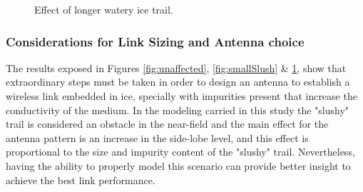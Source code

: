 \begin{figure}[H]
	\centering
	\caption{Effect of longer watery ice trail.}
	\label{fig:bigSlush}
\end{figure}

\subsubsection{Considerations for Link Sizing and Antenna choice}
The results exposed in Figures \ref{fig:unaffected}, \ref{fig:smallSlush} \& \ref{fig:bigSlush}, show that extraordinary steps must be taken in order to design an antenna to establish a wireless link embedded in ice, specially with impurities present that increase the conductivity of the medium. In the modeling carried in this study the "slushy" trail is considered an obstacle in the near-field and the main effect for the antenna pattern is an increase in the side-lobe level, and this effect is proportional to the size and impurity content of the "slushy" trail. Nevertheless, having the ability to properly model this scenario can provide better insight to achieve the best link performance.

